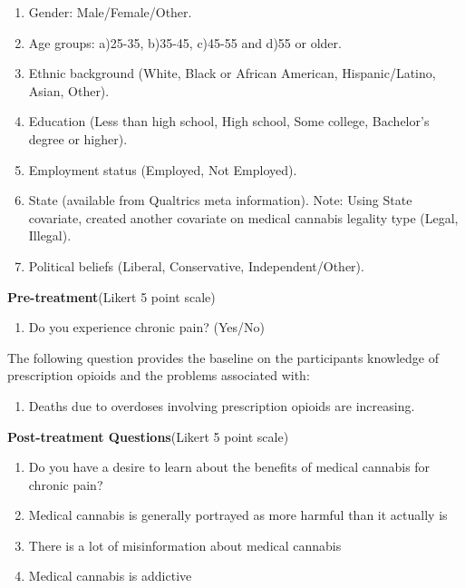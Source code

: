 \documentclass[
]{article}
\providecommand{\tightlist}{%
  \setlength{\itemsep}{0pt}\setlength{\parskip}{0pt}}
\begin{document}
\begin{enumerate}
\def\labelenumi{\arabic{enumi}.}
\tightlist
\item
  Gender: Male/Female/Other.
\item
  Age groups: a)25-35, b)35-45, c)45-55 and d)55 or older.
\item
  Ethnic background (White, Black or African American, Hispanic/Latino,
  Asian, Other).
\item
  Education (Less than high school, High school, Some college,
  Bachelor's degree or higher).
\item
  Employment status (Employed, Not Employed).
\item
  State (available from Qualtrics meta information). Note: Using State
  covariate, created another covariate on medical cannabis legality type
  (Legal, Illegal).
\item
  Political beliefs (Liberal, Conservative, Independent/Other).
\end{enumerate}

\textbf{Pre-treatment}(Likert 5 point scale)

\begin{enumerate}
\def\labelenumi{\arabic{enumi}.}
\setcounter{enumi}{7}
\tightlist
\item
  Do you experience chronic pain? (Yes/No)
\end{enumerate}

The following question provides the baseline on the participants
knowledge of prescription opioids and the problems associated with:

\begin{enumerate}
\def\labelenumi{\arabic{enumi}.}
\setcounter{enumi}{8}
\tightlist
\item
  Deaths due to overdoses involving prescription opioids are increasing.
\end{enumerate}

\textbf{Post-treatment Questions}(Likert 5 point scale)

\begin{enumerate}
\def\labelenumi{\arabic{enumi}.}
\tightlist
\item
  Do you have a desire to learn about the benefits of medical cannabis
  for chronic pain?
\item
  Medical cannabis is generally portrayed as more harmful than it
  actually is
\item
  There is a lot of misinformation about medical cannabis
\item
  Medical cannabis is addictive
\end{enumerate}
\end{document}
